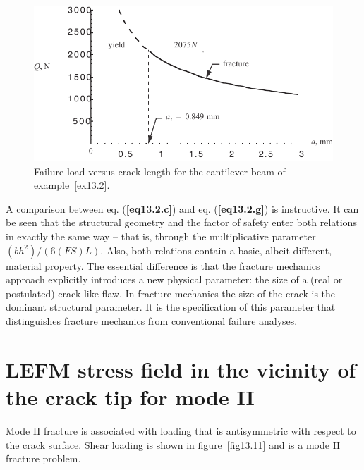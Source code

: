 \documentclass{AeroStructure-ERJohnson}
\begin{document}
\begin{example}
\begin{figure}[!h]
\includegraphics{Figure_13-10.pdf}
\caption{Failure load versus crack length for the cantilever beam of example~\ref{ex13.2}.} \label{fig13.10}
\end{figure}

A comparison between eq. (\textbf{\ref{eq13.2.c}}) and eq. (\textbf{\ref{eq13.2.g}}) is instructive. It can be seen that the structural geometry and the factor of safety enter both relations in exactly the same way – that is, through the multiplicative parameter $\left(b h^{2}\right) /(6(F S) L)$. Also, both relations contain a basic, albeit different, material property. The essential difference is that the fracture mechanics approach explicitly introduces a new physical parameter: the size of a (real or postulated) crack-like flaw. In fracture mechanics the size of the crack is the dominant structural parameter. It is the specification of this parameter that distinguishes fracture mechanics from conventional failure analyses.
\end{example}

\vspace*{-1pc}

\section{LEFM stress field in the vicinity of the crack tip for mode II}\label{sec13.4}

Mode II fracture is associated with loading that is antisymmetric with respect to the crack surface. Shear loading is shown in figure~\ref{fig13.11} and is a mode II fracture problem.

\vspace*{-6pt}
\end{document}
